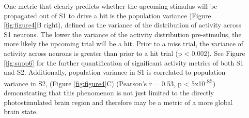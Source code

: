 One metric that clearly predicts whether the upcoming stimulus will be propagated out of S1 to drive a hit is the population variance  (Figure \ref{fig:figure4}B right), defined as the variance of the distribution of activity across S1 neurons. The lower the variance of the activity distribution pre-stimulus, the more likely the upcoming trial will be a hit. Prior to a miss trial, the variance of activity across neurons is greater than prior to a hit trial (p < 0.002). See Figure \ref{fig:supp6} for the further quantification of significant activity metrics of both S1 and S2.  Additionally, population variance in S1 is correlated to population variance in S2, (Figure \ref{fig:figure4}C) (Pearson’s r = 0.53, p < 5x10\textsuperscript{-85}) demonstrating that this phenomenon is not just limited to the directly photostimulated brain region and therefore may be a metric of a more global brain state.


